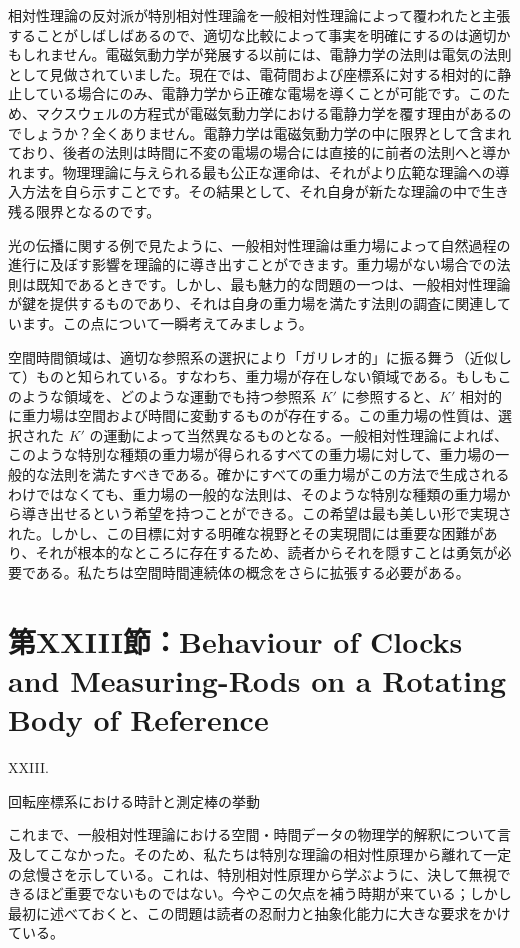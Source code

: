 \documentclass[a4paper,11pt,openany]{ltjsbook}
\begin{document}
相対性理論の反対派が特別相対性理論を一般相対性理論によって覆われたと主張することがしばしばあるので、適切な比較によって事実を明確にするのは適切かもしれません。電磁気動力学が発展する以前には、電静力学の法則は電気の法則として見做されていました。現在では、電荷間および座標系に対する相対的に静止している場合にのみ、電静力学から正確な電場を導くことが可能です。このため、マクスウェルの方程式が電磁気動力学における電静力学を覆す理由があるのでしょうか？全くありません。電静力学は電磁気動力学の中に限界として含まれており、後者の法則は時間に不変の電場の場合には直接的に前者の法則へと導かれます。物理理論に与えられる最も公正な運命は、それがより広範な理論への導入方法を自ら示すことです。その結果として、それ自身が新たな理論の中で生き残る限界となるのです。

光の伝播に関する例で見たように、一般相対性理論は重力場によって自然過程の進行に及ぼす影響を理論的に導き出すことができます。重力場がない場合での法則は既知であるときです。しかし、最も魅力的な問題の一つは、一般相対性理論が鍵を提供するものであり、それは自身の重力場を満たす法則の調査に関連しています。この点について一瞬考えてみましょう。

空間時間領域は、適切な参照系の選択により「ガリレオ的」に振る舞う（近似して）ものと知られている。すなわち、重力場が存在しない領域である。もしもこのような領域を、どのような運動でも持つ参照系 \( K' \) に参照すると、\( K' \) 相対的に重力場は空間および時間に変動するものが存在する。この重力場の性質は、選択された \( K' \) の運動によって当然異なるものとなる。一般相対性理論によれば、このような特別な種類の重力場が得られるすべての重力場に対して、重力場の一般的な法則を満たすべきである。確かにすべての重力場がこの方法で生成されるわけではなくても、重力場の一般的な法則は、そのような特別な種類の重力場から導き出せるという希望を持つことができる。この希望は最も美しい形で実現された。しかし、この目標に対する明確な視野とその実現間には重要な困難があり、それが根本的なところに存在するため、読者からそれを隠すことは勇気が必要である。私たちは空間時間連続体の概念をさらに拡張する必要がある。


\clearpage
\chapter{第XXIII節：Behaviour of Clocks and Measuring-Rods on a Rotating Body of Reference}

XXIII.

回転座標系における時計と測定棒の挙動

これまで、一般相対性理論における空間・時間データの物理学的解釈について言及してこなかった。そのため、私たちは特別な理論の相対性原理から離れて一定の怠慢さを示している。これは、特別相対性原理から学ぶように、決して無視できるほど重要でないものではない。今やこの欠点を補う時期が来ている；しかし最初に述べておくと、この問題は読者の忍耐力と抽象化能力に大きな要求をかけている。
\end{document}
